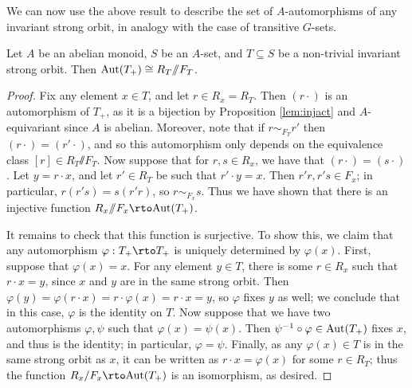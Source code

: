 \documentclass[11pt]{amsart}
\renewcommand{\ss}{\mathord{\sslash}}
\begin{document}




We can now use the above result to describe the set of $A$-automorphisms of any invariant strong orbit, in analogy with the case of transitive $G$-sets.



\begin{theorem}\label{Aut(T)}
  Let $A$ be an abelian monoid, $S$ be an $A$-set, and $T\subseteq S$ be a non-trivial invariant strong orbit. Then $\Aut(T_+) \cong R_T\ss F_T$. 
\end{theorem}

\begin{proof}
Fix any element $x\in T$, and let $r\in R_x=R_T$.  Then $(r\cdot)$ is an automorphism of $T_+$,  as it is a bijection by Proposition \ref{lem:injact} and $A$-equivariant since $A$ is abelian. Moreover, note that if $r\sim_{F_T} r'$ then $(r\cdot) = (r'\cdot)$, and so this automorphism only depends on the equivalence class $[r]\in R_T\ss F_T$.  Now suppose that for $r,s\in R_x$, we have that $(r\cdot) = (s\cdot)$.  Let $y = r\cdot x$, and let $r'\in R_T$ be such that $r' \cdot y = x$.  Then $r'r,r's\in F_x$; in particular, $r(r's) = s (r'r)$, so $r\sim_{F_x} s$.  Thus we have shown that there is an injective function $R_x\ss F_x \rto \Aut(T_+)$.

    It remains to check that this function is surjective.  To show this, we  claim that any automorphism $\varphi:T_+ \rto T_+$ is uniquely determined by $\varphi(x)$. First, suppose that $\varphi(x) = x$.  For any element $y\in T$, there is some $r\in R_x$ such that $r\cdot x = y$, since $x$ and $y$ are in the same strong orbit.  Then $\varphi(y) = \varphi(r\cdot x) = r\cdot \varphi(x) = r\cdot x = y$, so $\varphi$ fixes $y$ as well; we conclude that in this case, $\varphi$ is the identity on $T$.  Now suppose that we have two automorphisms $\varphi,\psi$ such that $\varphi(x) = \psi(x)$.  Then $\psi^{-1}\circ \varphi\in \mathrm{Aut}(T_+)$ fixes $x$, and thus is the identity; in particular, $\varphi = \psi$.  Finally, as any $\varphi(x)\in T$ is in the same strong orbit as $x$, it can be written as  $r\cdot x = \varphi(x)$ for some $r\in R_T$; thus the function $R_x/F_x \rto \Aut(T_+)$ is an isomorphism, as desired.
\end{proof}
\end{document}
